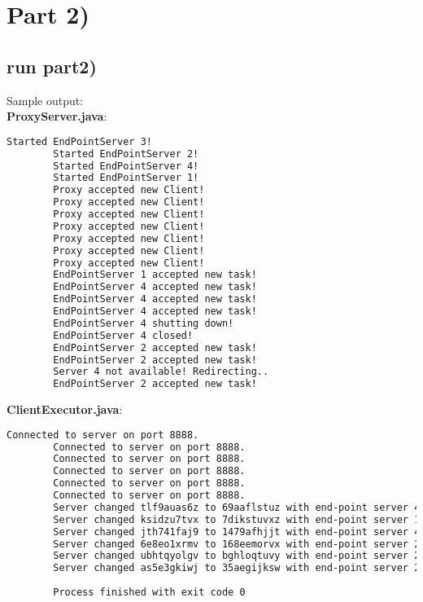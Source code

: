 \documentclass{article}
\begin{document}
  \section*{Part 2)} 
    
    \subsection*{run part2)}
      
      Sample output:\\
      \textbf{ProxyServer.java}:\\
      \begin{lstlisting}[language=sh]
        Started EndPointServer 3!
        Started EndPointServer 2!
        Started EndPointServer 4!
        Started EndPointServer 1!
        Proxy accepted new Client!
        Proxy accepted new Client!
        Proxy accepted new Client!
        Proxy accepted new Client!
        Proxy accepted new Client!
        Proxy accepted new Client!
        Proxy accepted new Client!
        EndPointServer 1 accepted new task!
        EndPointServer 4 accepted new task!
        EndPointServer 4 accepted new task!
        EndPointServer 4 accepted new task!
        EndPointServer 4 shutting down!
        EndPointServer 4 closed!
        EndPointServer 2 accepted new task!
        EndPointServer 2 accepted new task!
        Server 4 not available! Redirecting..
        EndPointServer 2 accepted new task!
      \end{lstlisting}
      \textbf{ClientExecutor.java}:\\
      \begin{lstlisting}[language=sh]
        Connected to server on port 8888.
        Connected to server on port 8888.
        Connected to server on port 8888.
        Connected to server on port 8888.
        Connected to server on port 8888.
        Connected to server on port 8888.
        Server changed tlf9auas6z to 69aaflstuz with end-point server 4
        Server changed ksidzu7tvx to 7dikstuvxz with end-point server 1
        Server changed jth741faj9 to 1479afhjjt with end-point server 4
        Server changed 6e8eo1xrmv to 168eemorvx with end-point server 2
        Server changed ubhtqyolgv to bghloqtuvy with end-point server 2
        Server changed as5e3gkiwj to 35aegijksw with end-point server 2
        
        Process finished with exit code 0
      \end{lstlisting}
	
\end{document}
